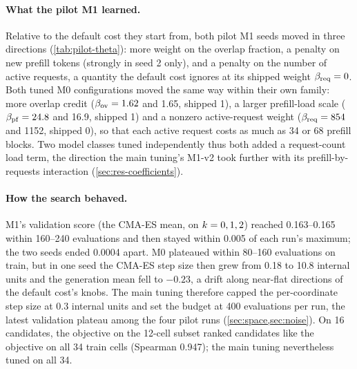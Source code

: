 \paragraph{What the pilot M1 learned.}
Relative to the default cost they start from, both pilot M1 seeds moved in three directions
(\cref{tab:pilot-theta}): more weight on the overlap fraction, a penalty on new prefill tokens
(strongly in seed 2 only), and a penalty on the number of active requests, a quantity the default
cost ignores at its shipped weight $\beta_{\mathrm{req}} = 0$. Both tuned M0 configurations moved the same way
within their own family: more overlap credit ($\beta_{\mathrm{ov}} = 1.62$ and 1.65, shipped 1), a larger
prefill-load scale ($\beta_{\mathrm{pf}} = 24.8$ and 16.9, shipped 1) and a nonzero active-request weight
($\beta_{\mathrm{req}} = 854$ and \num{1152}, shipped 0), so that each active request costs as much as 34 or 68
prefill blocks. Two model classes tuned independently thus both added a request-count load term,
the direction the main tuning's M1-v2 took further with its prefill-by-requests interaction
(\cref{sec:res-coefficients}).

\paragraph{How the search behaved.}
M1's validation score (the CMA-ES mean, on $k = 0,1,2$) reached 0.163--0.165 within 160--240
evaluations and then stayed within 0.005 of each run's maximum; the two seeds ended 0.0004 apart.
M0 plateaued within 80--160 evaluations on train, but in one seed the CMA-ES step size then grew
from 0.18 to 10.8 internal units and the generation mean fell to $-0.23$, a drift along
near-flat directions of the default cost's knobs. The main tuning therefore capped the per-coordinate
step size at 0.3 internal units and set the budget at 400 evaluations per run, the latest
validation plateau among the four pilot runs (\cref{sec:space,sec:noise}). On 16 candidates, the
objective on the 12-cell subset ranked candidates like the objective on all 34 train cells
(Spearman 0.947); the main tuning nevertheless tuned on all 34.
